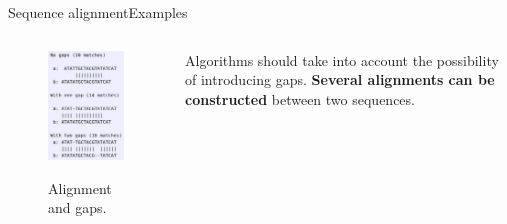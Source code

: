 \documentclass[10pt]{beamer}
\begin{document}
{%
\begin{frame}{Sequence alignment}{Examples}
\begin{columns}
	\begin{column}{0.48\textwidth}
		\begin{figure}[]
			\centering
			\includegraphics[width=\textwidth,height=0.7\textheight,keepaspectratio]{img/alignment/al2.jpg}
			\label{img:alig}
			\caption{Alignment and gaps.}
		\end{figure}
	\end{column}
	\begin{column}{0.48\textwidth}
		Algorithms should take into account the possibility of introducing gaps. \textbf{Several alignments can be constructed} between two sequences.
	\end{column}
\end{columns}
	

\end{frame}}
\end{document}
